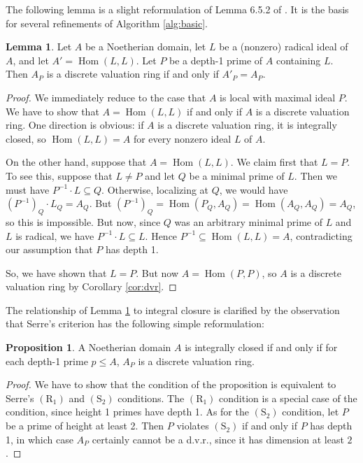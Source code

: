\documentclass{amsart}
\theoremstyle{definition}
\newtheorem{lemma}[theorem]{Lemma}
\newtheorem{proposition}[theorem]{Proposition}
\DeclareMathOperator{\Hom}{Hom}
\newcommand{\Rone}{(\text{R}_1)}
\newcommand{\Stwo}{(\text{S}_2)}
\begin{document}
The following lemma is a slight reformulation of Lemma 6.5.2 of \cite{Va}. It is the basis for several refinements of Algorithm \ref{alg:basic}.
\begin{lemma}\label{lemma:hom}
Let $A$ be a Noetherian domain, let $L$ be a (nonzero) radical ideal of $A$, and let $A' = \Hom(L,L)$.  Let $P$ be a depth-1 prime of $A$ containing $L$.  Then $A_P$ is a discrete valuation ring if and only if $A'_P = A_P$.
\end{lemma}
\begin{proof}
We immediately reduce to the case that $A$ is local with maximal ideal $P$.  We have to show that $A = \Hom(L,L)$ if and only if $A$ is a discrete valuation ring.  One direction is obvious: if $A$ is a discrete valuation ring, it is integrally closed, so $\Hom(L,L) = A$ for every nonzero ideal $L$ of $A$.

On the other hand, suppose that $A = \Hom(L,L)$.  We claim first that $L = P$.  To see this, suppose that $L\neq P$ and let $Q$ be a minimal prime of $L$.  Then we must have $P^{-1}\cdot L \subseteq Q$.  Otherwise, localizing at $Q$, we would have $(P^{-1})_Q \cdot L_Q = A_Q$.  But $(P^{-1})_Q = \Hom(P_Q, A_Q) = \Hom(A_Q, A_Q) = A_Q$, so this is impossible.  But now, since $Q$ was an arbitrary minimal prime of $L$ and $L$ is radical, we have $P^{-1}\cdot L \subseteq L$.  Hence $P^{-1}\subseteq \Hom(L,L) = A$, contradicting our assumption that $P$ has depth 1.

So, we have shown that $L = P$.  But now $A = \Hom(P,P)$, so $A$ is a discrete valuation ring by Corollary \ref{cor:dvr}.
\end{proof}

The relationship of Lemma \ref{lemma:hom} to integral closure is clarified by the observation that Serre's criterion has the following simple reformulation:
\begin{proposition}\label{prop:serre}
A Noetherian domain $A$ is integrally closed if and only if for each depth-1 prime $p\leq A$, $A_P$ is a discrete valuation ring.
\end{proposition}
\begin{proof}
We have to show that the condition of the proposition is equivalent to Serre's $\Rone$ and $\Stwo$ conditions.  The $\Rone$ condition is a special case of the condition, since height 1 primes have depth 1.  As for the $\Stwo$ condition, let $P$ be a prime of height at least 2.  Then $P$ violates $\Stwo$ if and only if $P$ has depth 1, in which case $A_P$ certainly cannot be a d.v.r., since it has dimension at least $2$.
\end{proof}
\end{document}
